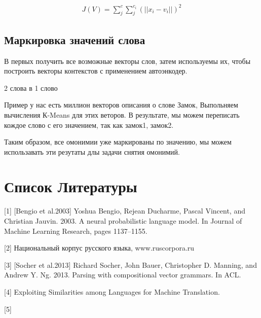 \documentclass[12pt]{article}
\begin{document}
	\begin{align}
		J(V) = \sum_{j}^{c}\sum_{j}^{c_i}(||x_i-v_i||)^2
	\end{align}
\subsection{Маркировка значений слова}

В первых получить все возможные векторы слов, затем используемы их, чтобы построить векторы контекстов с применением автоэнкодер.

2 слова в 1 слово

Пример у нас есть миллион векторов описания о слове Замок, Выпольняем вычисления К-Means для этих веторов. В результате, мы можем переписать кождое слово с его значением, так как замок1, замок2.

Таким образом, все омонимии уже маркированы по значению, мы можем использавать эти резутаты длы задачи снятия омонимий.
\section{Список Литературы}

[1] [Bengio et al.2003] Yoshua Bengio, Rejean Ducharme, Pascal Vincent, and Christian Jauvin. 2003. A neural probabilistic language model. In Journal of Machine Learning Research, pages 1137–1155.

[2] Национальный корпус русского языка, www.ruscorpora.ru

[3] [Socher et al.2013] Richard Socher, John Bauer, Christopher D. Manning, and Andrew Y. Ng. 2013. Parsing with compositional vector grammars. In ACL.

[4] Exploiting Similarities among Languages for Machine Translation.

[5] 
\end{document}
